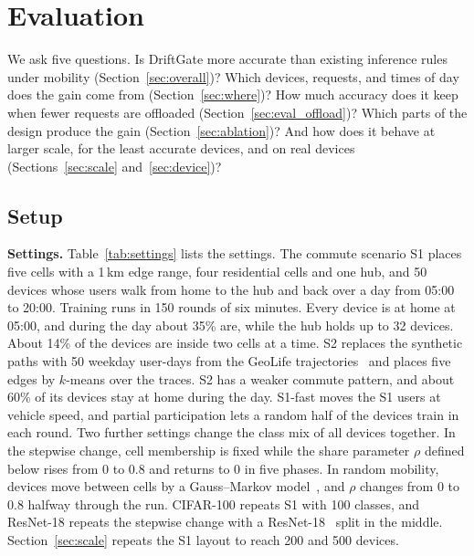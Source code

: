 \section{Evaluation}
\label{sec:evaluation}

We ask five questions. Is DriftGate more accurate than existing inference rules under mobility (Section~\ref{sec:overall})? Which devices, requests, and times of day does the gain come from (Section~\ref{sec:where})? How much accuracy does it keep when fewer requests are offloaded (Section~\ref{sec:eval_offload})? Which parts of the design produce the gain (Section~\ref{sec:ablation})? And how does it behave at larger scale, for the least accurate devices, and on real devices (Sections~\ref{sec:scale} and~\ref{sec:device})?

\subsection{Setup}
\label{sec:setup}

\textbf{Settings.} Table~\ref{tab:settings} lists the settings. The commute scenario S1 places five cells with a 1\,km edge range, four residential cells and one hub, and 50 devices whose users walk from home to the hub and back over a day from 05:00 to 20:00. Training runs in 150 rounds of six minutes. Every device is at home at 05:00, and during the day about 35\% are, while the hub holds up to 32 devices. About 14\% of the devices are inside two cells at a time. S2 replaces the synthetic paths with 50 weekday user-days from the GeoLife trajectories~\cite{zheng2010geolife} and places five edges by $k$-means over the traces. S2 has a weaker commute pattern, and about 60\% of its devices stay at home during the day. S1-fast moves the S1 users at vehicle speed, and partial participation lets a random half of the devices train in each round. Two further settings change the class mix of all devices together. In the stepwise change, cell membership is fixed while the share parameter $\rho$ defined below rises from 0 to 0.8 and returns to 0 in five phases. In random mobility, devices move between cells by a Gauss--Markov model~\cite{liang1999gaussmarkov}, and $\rho$ changes from 0 to 0.8 halfway through the run. CIFAR-100 repeats S1 with 100 classes, and ResNet-18 repeats the stepwise change with a ResNet-18~\cite{he2016resnet} split in the middle. Section~\ref{sec:scale} repeats the S1 layout to reach 200 and 500 devices.

